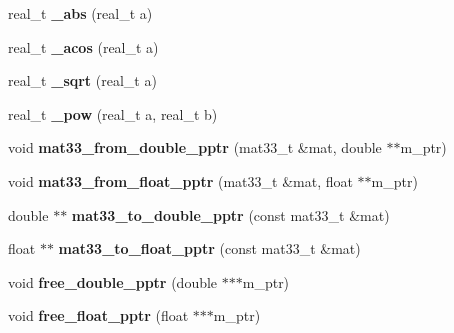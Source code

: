 \begin{DoxyCompactItemize}
\item 
real\+\_\+t {\bfseries \+\_\+abs} (real\+\_\+t a)\hypertarget{namespacekukadu_a43c03badfc041b77200b7dfb6a115bcd}{}\label{namespacekukadu_a43c03badfc041b77200b7dfb6a115bcd}

\item 
real\+\_\+t {\bfseries \+\_\+acos} (real\+\_\+t a)\hypertarget{namespacekukadu_a92b3eb9be88bcb45eb973eb2cef8d5d6}{}\label{namespacekukadu_a92b3eb9be88bcb45eb973eb2cef8d5d6}

\item 
real\+\_\+t {\bfseries \+\_\+sqrt} (real\+\_\+t a)\hypertarget{namespacekukadu_a1bb5ac8a3368fc12fb69da3f508c895a}{}\label{namespacekukadu_a1bb5ac8a3368fc12fb69da3f508c895a}

\item 
real\+\_\+t {\bfseries \+\_\+pow} (real\+\_\+t a, real\+\_\+t b)\hypertarget{namespacekukadu_a8f42eb7c1a7c3437be8fd4e8fa2b12d2}{}\label{namespacekukadu_a8f42eb7c1a7c3437be8fd4e8fa2b12d2}

\item 
void {\bfseries mat33\+\_\+from\+\_\+double\+\_\+pptr} (mat33\+\_\+t \&mat, double $\ast$$\ast$m\+\_\+ptr)\hypertarget{namespacekukadu_ac28a9627c82892855c26a3a52ab2e29f}{}\label{namespacekukadu_ac28a9627c82892855c26a3a52ab2e29f}

\item 
void {\bfseries mat33\+\_\+from\+\_\+float\+\_\+pptr} (mat33\+\_\+t \&mat, float $\ast$$\ast$m\+\_\+ptr)\hypertarget{namespacekukadu_adb3671a2e5ac60a8c5176129a4647d05}{}\label{namespacekukadu_adb3671a2e5ac60a8c5176129a4647d05}

\item 
double $\ast$$\ast$ {\bfseries mat33\+\_\+to\+\_\+double\+\_\+pptr} (const mat33\+\_\+t \&mat)\hypertarget{namespacekukadu_aae6bf3c48be4c299d143471ee6a4bbe7}{}\label{namespacekukadu_aae6bf3c48be4c299d143471ee6a4bbe7}

\item 
float $\ast$$\ast$ {\bfseries mat33\+\_\+to\+\_\+float\+\_\+pptr} (const mat33\+\_\+t \&mat)\hypertarget{namespacekukadu_a17c545b47e913a5323f119dd3d5376e4}{}\label{namespacekukadu_a17c545b47e913a5323f119dd3d5376e4}

\item 
void {\bfseries free\+\_\+double\+\_\+pptr} (double $\ast$$\ast$$\ast$m\+\_\+ptr)\hypertarget{namespacekukadu_adb34fe7ffb53d7440d906bb8040de6fa}{}\label{namespacekukadu_adb34fe7ffb53d7440d906bb8040de6fa}

\item 
void {\bfseries free\+\_\+float\+\_\+pptr} (float $\ast$$\ast$$\ast$m\+\_\+ptr)\hypertarget{namespacekukadu_a948786690a81a0ca1c525bc71579c071}{}\label{namespacekukadu_a948786690a81a0ca1c525bc71579c071}


\end{DoxyCompactItemize}
